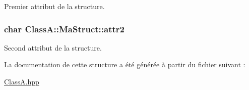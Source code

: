 Premier attribut de la structure. \hypertarget{struct_class_a_1_1_ma_struct_aaaa68ea043748cccd75e3c0403ea4d87}{
\subsubsection[{attr2}]{\setlength{\rightskip}{0pt plus 5cm}char {\bf ClassA::MaStruct::attr2}}}
\label{struct_class_a_1_1_ma_struct_aaaa68ea043748cccd75e3c0403ea4d87}


Second attribut de la structure. 

La documentation de cette structure a été générée à partir du fichier suivant :\begin{DoxyCompactItemize}
\item 
\hyperlink{_class_a_8hpp}{ClassA.hpp}\end{DoxyCompactItemize}
